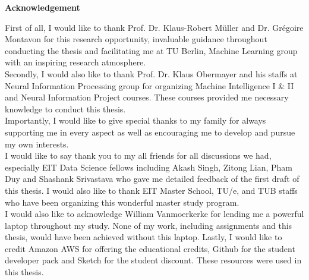 \thispagestyle{empty}
\vspace*{3cm}
\begin{center}
    \textbf{Acknowledgement}
\end{center}

\noindent
First of all, I would like to thank Prof. Dr. Klaus-Robert M\"{u}ller and Dr. Gr\'{e}goire Montavon for this research opportunity, invaluable guidance throughout conducting the thesis and facilitating me at TU Berlin, Machine Learning group with an inspiring research atmosphere.
\\

\noindent
Secondly, I would also like to thank Prof. Dr. Klaus Obermayer and his staffs at Neural Information Processing group for organizing Machine Intelligence I \& II and Neural Information Project courses. These courses provided me necessary knowledge to conduct this thesis.
\\

\noindent
Importantly, I would like to give special thanks to my family for always supporting me in every aspect as well as encouraging me to develop and pursue my own interests.
\\

\noindent
I would like to say thank you to my all friends for all discussions we had, especially EIT Data Science fellows including Akash Singh, Zitong Lian, Pham Duy and Shashank Srivastava who gave me detailed feedback of the first draft of this thesis. I would also like to thank EIT Master School, TU/e, and TUB staffs who have been organizing this wonderful master study program.
\\

\noindent
I would also like to acknowledge William Vanmoerkerke for lending me a powerful laptop throughout my study. None of my work, including assignments and this thesis, would have been achieved without this laptop.  Lastly, I would like to credit Amazon AWS for offering the educational credits, Github for the student developer pack and Sketch for the student discount. These resources were used in this thesis.